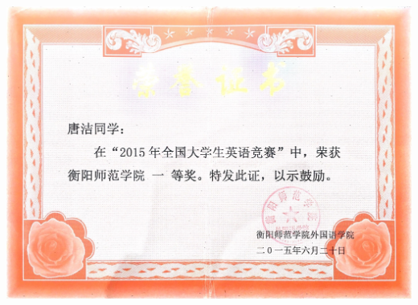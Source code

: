 \documentclass[UFT8]{ctexart}%
\begin{document}
\begin{center}
 \includegraphics[scale=0.2]{figs/2015-06.png }
\end{center}



%
%
%
\end{document}
